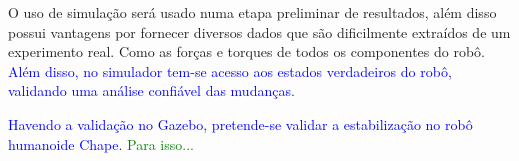 
O uso de simulação será usado numa etapa preliminar de resultados, além disso possui vantagens por fornecer diversos dados que são dificilmente extraídos de um experimento real. Como as forças e torques de todos os componentes do robô. \textcolor{blue}{Além disso, no simulador tem-se acesso aos estados verdadeiros do robô, validando uma análise confiável das mudanças.}

\textcolor{blue}{Havendo a validação no Gazebo, pretende-se validar a estabilização no robô humanoide Chape.} \textcolor{green}{ Para isso...}





\newpage



\printbibliography
